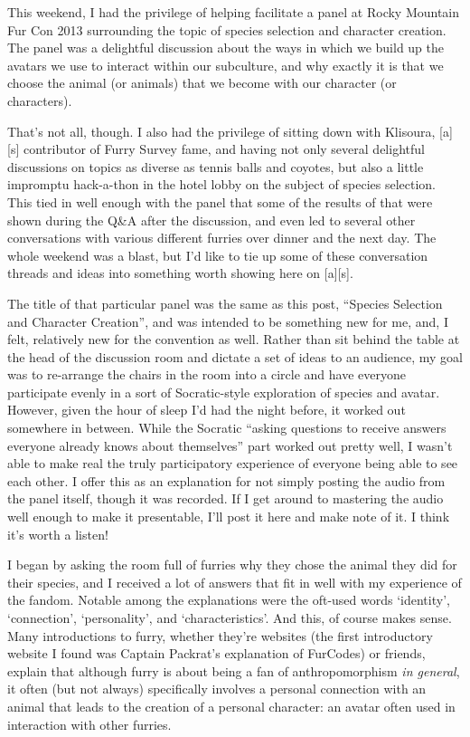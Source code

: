 This weekend, I had the privilege of helping facilitate a panel at Rocky
Mountain Fur Con 2013 surrounding the topic of species selection and
character creation. The panel was a delightful discussion about the ways
in which we build up the avatars we use to interact within our
subculture, and why exactly it is that we choose the animal (or animals)
that we become with our character (or characters).

That's not all, though. I also had the privilege of sitting down with
Klisoura, {[}a{]}{[}s{]} contributor of Furry Survey fame, and having
not only several delightful discussions on topics as diverse as tennis
balls and coyotes, but also a little impromptu hack-a-thon in the hotel
lobby on the subject of species selection. This tied in well enough with
the panel that some of the results of that were shown during the Q\&A
after the discussion, and even led to several other conversations with
various different furries over dinner and the next day. The whole
weekend was a blast, but I'd like to tie up some of these conversation
threads and ideas into something worth showing here on {[}a{]}{[}s{]}.

The title of that particular panel was the same as this post, ``Species
Selection and Character Creation'', and was intended to be something new
for me, and, I felt, relatively new for the convention as well. Rather
than sit behind the table at the head of the discussion room and dictate
a set of ideas to an audience, my goal was to re-arrange the chairs in
the room into a circle and have everyone participate evenly in a sort of
Socratic-style exploration of species and avatar. However, given the
hour of sleep I'd had the night before, it worked out somewhere in
between. While the Socratic ``asking questions to receive answers
everyone already knows about themselves'' part worked out pretty well, I
wasn't able to make real the truly participatory experience of everyone
being able to see each other. I offer this as an explanation for not
simply posting the audio from the panel itself, though it was recorded.
If I get around to mastering the audio well enough to make it
presentable, I'll post it here and make note of it. I think it's worth a
listen!

I began by asking the room full of furries why they chose the animal
they did for their species, and I received a lot of answers that fit in
well with my experience of the fandom. Notable among the explanations
were the oft-used words `identity', `connection', `personality', and
`characteristics'. And this, of course makes sense. Many introductions
to furry, whether they're websites (the first introductory website I
found was Captain Packrat's explanation of FurCodes) or friends, explain
that although furry is about being a fan of anthropomorphism \emph{in
general}, it often (but not always) specifically involves a personal
connection with an animal that leads to the creation of a personal
character: an avatar often used in interaction with other furries.

